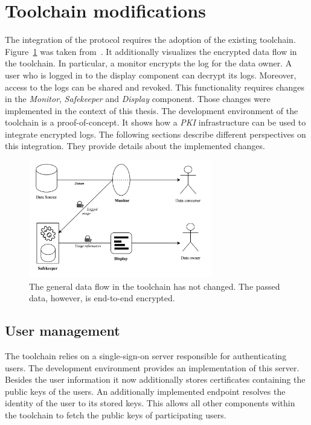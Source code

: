 \documentclass[../main.tex]{subfiles}
\begin{document}
\section{Toolchain modifications}
\label{sec:toolchain-modifications}
The integration of the protocol requires the adoption of the existing toolchain.
Figure~\ref{fig:encrypted-toolchain} was taken from~\cite{Zieglmeier2021}.
It additionally visualizes the encrypted data flow in the toolchain.
In particular, a monitor encrypts the log for the data owner.
A user who is logged in to the display component can decrypt its logs.
Moreover, access to the logs can be shared and revoked.
This functionality requires changes in the \textit{Monitor}, \textit{Safekeeper} and \textit{Display} component.
Those changes were implemented in the context of this thesis.
The development environment of the toolchain is a proof-of-concept.
It shows how a \textit{PKI} infrastructure can be used to integrate encrypted logs.
The following sections describe different perspectives on this integration.
They provide details about the implemented changes.


\begin{figure}[h!]
    \includegraphics[width=8cm]{../img/06/encrypted_toolchain.jpg}
    \centering
    \caption{The general data flow in the toolchain has not changed. The passed data, however, is end-to-end encrypted.}
    \label{fig:encrypted-toolchain}
\end{figure}

\subsection{User management}
The toolchain relies on a single-sign-on server responsible for authenticating users.
The development environment provides an implementation of this server.
Besides the user information it now additionally stores certificates containing the public keys of the users.
An additionally implemented endpoint resolves the identity of the user to its stored keys.
This allows all other components within the toolchain to fetch the public keys of participating users.
\end{document}
